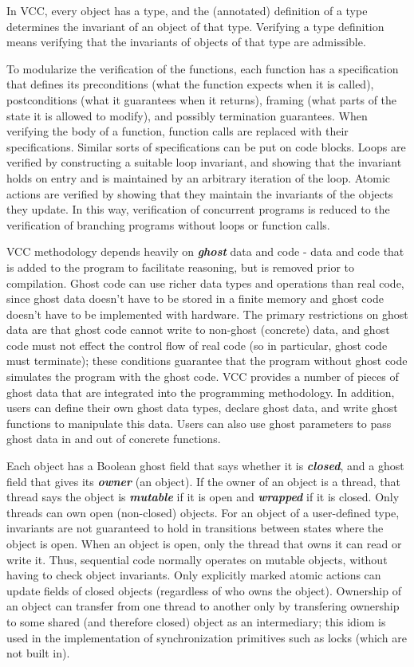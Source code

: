 \documentclass[preprint,nocopyrightspace]{sigplanconf}
\newcommand{\Def}[1]{\textit{\textbf{#1}}}
\begin{document}
In VCC, every object has a type, and the (annotated) definition of a
type determines the invariant of an object of that type. Verifying a
type definition means verifying that the invariants of objects of that
type are admissible. 

To modularize the verification of the functions, each function has a
specification that defines its preconditions (what the function
expects when it is called), postconditions (what it guarantees when it
returns), framing (what parts of the state it is allowed to modify),
and possibly termination guarantees. When verifying the body of a
function, function calls are replaced with their
specifications. Similar sorts of specifications can be put on code
blocks. Loops are verified by constructing a suitable loop invariant,
and showing that the invariant holds on entry and is maintained by an
arbitrary iteration of the loop. Atomic actions are verified by
showing that they maintain the invariants of the objects they
update. In this way, verification of concurrent programs is reduced to
the verification of branching programs without loops or function
calls.

VCC methodology depends heavily on \Def{ghost} data and code - data
and code that is added to the program to facilitate reasoning, but is
removed prior to compilation. Ghost code can use richer data types and
operations than real code, since ghost data doesn't have to be stored
in a finite memory and ghost code doesn't have to be implemented with
hardware.  The primary restrictions on ghost data are that ghost code
cannot write to non-ghost (concrete) data, and ghost code must not
effect the control flow of real code (so in particular, ghost code
must terminate); these conditions guarantee that the program without
ghost code simulates the program with the ghost code. VCC provides a
number of pieces of ghost data that are integrated into the
programming methodology. In addition, users can define their own ghost
data types, declare ghost data, and write ghost functions to
manipulate this data.  Users can also use ghost parameters to pass
ghost data in and out of concrete functions.

Each object has a Boolean ghost field that says whether it
is \Def{closed}, and a ghost field that gives its \Def{owner} (an
object). If the owner of an object is a thread, that thread says the
object is \Def{mutable} if it is open and \Def{wrapped} if it is closed.
Only threads can own open (non-closed) objects. For an 
object of a user-defined type, invariants are not guaranteed to hold
in transitions between states where the object is open. When an object
is open, only the thread that owns it can read or write it. Thus,
sequential code normally operates on mutable objects,
without having to check object invariants. Only explicitly marked
atomic actions can update fields of closed objects (regardless of who
owns the object). Ownership of an object can transfer from one thread
to another only by transfering ownership to some shared (and therefore
closed) object as an intermediary; this idiom is used in the
implementation of synchronization primitives such as locks (which are
not built in). 
\end{document}
